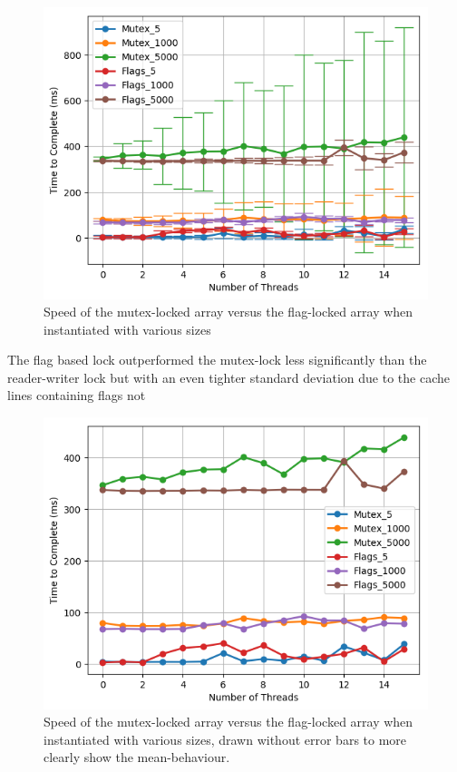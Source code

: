 \documentclass[11pt]{article}
\begin{document}
\begin{figure}\label{fig:step6_1}
\centering
\includegraphics[scale=0.65]{step6_1.png}
\caption{Speed of the mutex-locked array versus the flag-locked array when instantiated with various sizes}
\end{figure}

The flag based lock outperformed the mutex-lock less significantly than the reader-writer lock but with an even tighter standard deviation due to the cache lines containing flags not 

\begin{figure}\label{fig:step6_2}
\centering
\includegraphics[scale=0.65]{step6_2.png}
\caption{Speed of the mutex-locked array versus the flag-locked array when instantiated with various sizes, drawn without error bars to more clearly show the mean-behaviour.}
\end{figure}
\end{document}
